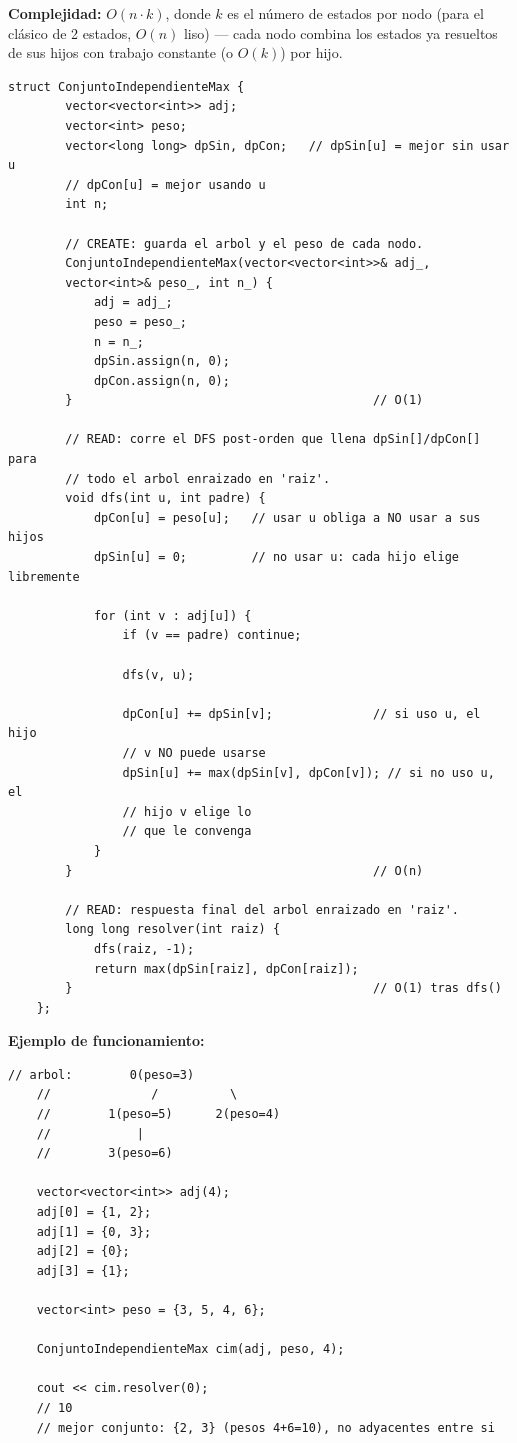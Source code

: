 \documentclass[10pt,a4paper,twocolumn]{article}
\begin{document}
\textbf{Complejidad:} $O(n \cdot k)$, donde $k$ es el número de
estados por nodo (para el clásico de 2 estados, $O(n)$ liso) — cada
nodo combina los estados ya resueltos de sus hijos con trabajo
constante (o $O(k)$) por hijo.

\begin{lstlisting}[style=cpp]
	struct ConjuntoIndependienteMax {
		vector<vector<int>> adj;
		vector<int> peso;
		vector<long long> dpSin, dpCon;   // dpSin[u] = mejor sin usar u
		// dpCon[u] = mejor usando u
		int n;
		
		// CREATE: guarda el arbol y el peso de cada nodo.
		ConjuntoIndependienteMax(vector<vector<int>>& adj_,
		vector<int>& peso_, int n_) {
			adj = adj_;
			peso = peso_;
			n = n_;
			dpSin.assign(n, 0);
			dpCon.assign(n, 0);
		}                                          // O(1)
		
		// READ: corre el DFS post-orden que llena dpSin[]/dpCon[] para
		// todo el arbol enraizado en 'raiz'.
		void dfs(int u, int padre) {
			dpCon[u] = peso[u];   // usar u obliga a NO usar a sus hijos
			dpSin[u] = 0;         // no usar u: cada hijo elige libremente
			
			for (int v : adj[u]) {
				if (v == padre) continue;
				
				dfs(v, u);
				
				dpCon[u] += dpSin[v];              // si uso u, el hijo
				// v NO puede usarse
				dpSin[u] += max(dpSin[v], dpCon[v]); // si no uso u, el
				// hijo v elige lo
				// que le convenga
			}
		}                                          // O(n)
		
		// READ: respuesta final del arbol enraizado en 'raiz'.
		long long resolver(int raiz) {
			dfs(raiz, -1);
			return max(dpSin[raiz], dpCon[raiz]);
		}                                          // O(1) tras dfs()
	};
\end{lstlisting}

\textbf{Ejemplo de funcionamiento:}

\begin{lstlisting}[style=cpp]
	// arbol:        0(peso=3)
	//              /          \
	//        1(peso=5)      2(peso=4)
	//            |
	//        3(peso=6)
	
	vector<vector<int>> adj(4);
	adj[0] = {1, 2};
	adj[1] = {0, 3};
	adj[2] = {0};
	adj[3] = {1};
	
	vector<int> peso = {3, 5, 4, 6};
	
	ConjuntoIndependienteMax cim(adj, peso, 4);
	
	cout << cim.resolver(0);
	// 10
	// mejor conjunto: {2, 3} (pesos 4+6=10), no adyacentes entre si
\end{lstlisting}
\end{document}
